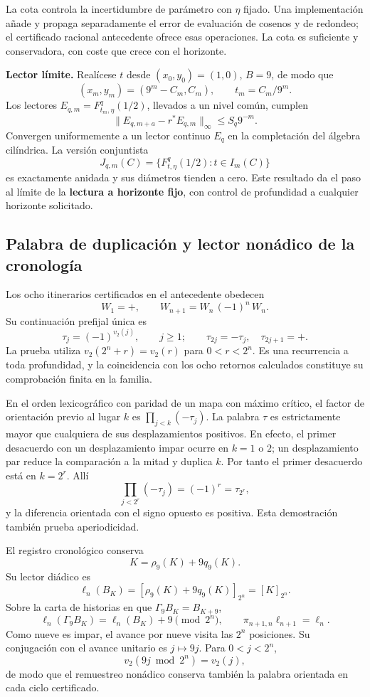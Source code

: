La cota controla la incertidumbre de parámetro con \(\eta\) fijado. Una implementación añade y propaga separadamente el error de evaluación de cosenos y de redondeo; el certificado racional antecedente ofrece esas operaciones. La cota es suficiente y conservadora, con coste que crece con el horizonte.

\textbf{Lector límite.} Realícese \(t\) desde \((x_0,y_0)=(1,0)\), \(B=9\), de modo que
\[
(x_m,y_m)=(9^m-C_m,C_m),\qquad t_m=C_m/9^m.
\]
Los lectores \(E_{q,m}=F_{t_m,\eta}^{q}(1/2)\), llevados a un nivel común, cumplen
\[
\|E_{q,m+a}-r^*E_{q,m}\|_\infty\le S_q9^{-m}.
\]
Convergen uniformemente a un lector continuo \(E_q\) en la completación del álgebra cilíndrica. La versión conjuntista
\[
J_{q,m}(C)=\{F_{t,\eta}^{q}(1/2):t\in I_m(C)\}
\]
es exactamente anidada y sus diámetros tienden a cero. Este resultado da el paso al límite de la \textbf{lectura a horizonte fijo}, con control de profundidad a cualquier horizonte solicitado.


\subsection{Palabra de duplicación y lector nonádico de la cronología}
\label{hmtfg:prolongacion:4}

Los ocho itinerarios certificados en el antecedente obedecen
\[
W_1=+,\qquad W_{n+1}=W_n\,(-1)^n\,W_n.
\]
Su continuación prefijal única es
\[
\tau_j=(-1)^{v_2(j)},\qquad j\ge1;
\qquad \tau_{2j}=-\tau_j,\quad\tau_{2j+1}=+.
\]
La prueba utiliza \(v_2(2^n+r)=v_2(r)\) para \(0<r<2^n\). Es una recurrencia a toda profundidad, y la coincidencia con los ocho retornos calculados constituye su comprobación finita en la familia.

En el orden lexicográfico con paridad de un mapa con máximo crítico, el factor de orientación previo al lugar \(k\) es \(\prod_{j<k}(-\tau_j)\). La palabra \(\tau\) es estrictamente mayor que cualquiera de sus desplazamientos positivos. En efecto, el primer desacuerdo con un desplazamiento impar ocurre en \(k=1\) o \(2\); un desplazamiento par reduce la comparación a la mitad y duplica \(k\). Por tanto el primer desacuerdo está en \(k=2^r\). Allí
\[
\prod_{j<2^r}(-\tau_j)=(-1)^r=\tau_{2^r},
\]
y la diferencia orientada con el signo opuesto es positiva. Esta demostración también prueba aperiodicidad.

El registro cronológico conserva
\[
K=\rho_9(K)+9q_9(K).
\]
Su lector diádico es
\[
\ell_n(B_K)=[\rho_9(K)+9q_9(K)]_{2^n}=[K]_{2^n}.
\]
Sobre la carta de historias en que \(\Gamma_9 B_K=B_{K+9}\),
\[
\ell_n(\Gamma_9B_K)=\ell_n(B_K)+9\pmod{2^n},\qquad
\pi_{n+1,n}\ell_{n+1}=\ell_n.
\]
Como nueve es impar, el avance por nueve visita las \(2^n\) posiciones. Su conjugación con el avance unitario es \(j\mapsto9j\). Para \(0<j<2^n\),
\[
v_2(9j\bmod2^n)=v_2(j),
\]
de modo que el remuestreo nonádico conserva también la palabra orientada en cada ciclo certificado.

